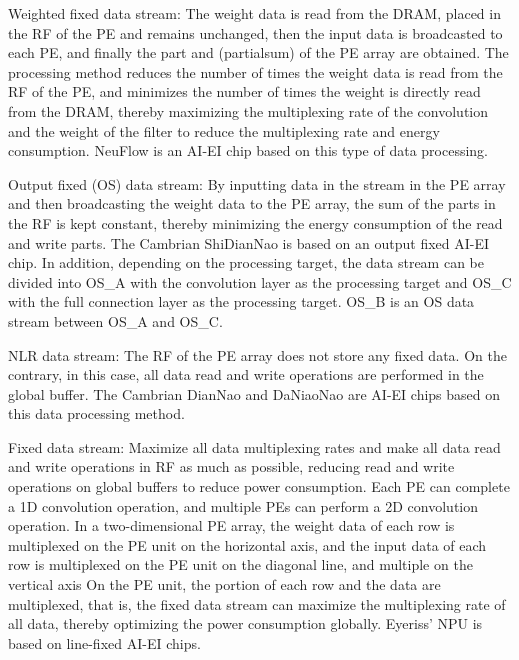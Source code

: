 \documentclass[UTF8,12pt,a4paper]{article}
\begin{document}
Weighted fixed data stream: The weight data is read from the DRAM,
placed in the RF of the PE and remains unchanged,
then the input data is broadcasted to each PE,
and finally the part and (partialsum) of the PE array are obtained.
The processing method reduces the number of times the weight data is read from the RF of the PE,
and minimizes the number of times the weight is directly read from the DRAM,
thereby maximizing the multiplexing rate of the convolution
and the weight of the filter to reduce the multiplexing rate and energy consumption.
NeuFlow is an AI-EI chip based on this type of data processing.

Output fixed (OS) data stream: By inputting data in the stream in the PE array
and then broadcasting the weight data to the PE array,
the sum of the parts in the RF is kept constant,
thereby minimizing the energy consumption of the read and write parts.
The Cambrian ShiDianNao is based on an output fixed AI-EI chip.
In addition, depending on the processing target,
the data stream can be divided into OS\_A with the convolution layer as the processing target
and OS\_C with the full connection layer as the processing target.
OS\_B is an OS data stream between OS\_A and OS\_C.

NLR data stream: The RF of the PE array does not store any fixed data.
On the contrary, in this case, all data read and write operations are performed in the global buffer.
The Cambrian DianNao and DaNiaoNao are AI-EI chips based on this data processing method.

Fixed data stream: Maximize all data multiplexing rates and make all data read and write operations in RF as much as possible,
reducing read and write operations on global buffers to reduce power consumption.
Each PE can complete a 1D convolution operation,
and multiple PEs can perform a 2D convolution operation.
In a two-dimensional PE array, the weight data of each row is multiplexed on the PE unit on the horizontal axis,
and the input data of each row is multiplexed on the PE unit on the diagonal line,
and multiple on the vertical axis On the PE unit,
the portion of each row and the data are multiplexed, that is,
the fixed data stream can maximize the multiplexing rate of all data,
thereby optimizing the power consumption globally.
Eyeriss' NPU is based on line-fixed AI-EI chips.

\clearpage
\end{document}
